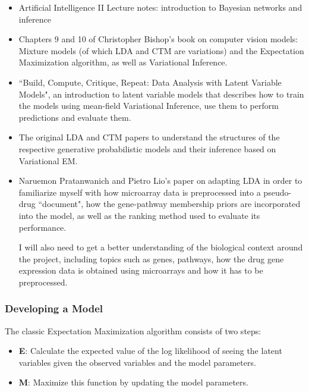 \documentclass[12pt,a4]{article}
\begin{document}
\begin{itemize}
\item Artificial Intelligence II Lecture notes: introduction to Bayesian networks and inference
\item Chapters 9 and 10 of Christopher Bishop's book\cite{Bishop:2006:PRM:1162264} on computer vision models: Mixture models (of which LDA and CTM are variations) and the Expectation Maximization algorithm, as well as Variational Inference.
\item ``Build, Compute, Critique, Repeat: Data Analysis with Latent Variable Models"\cite{doi:10.1146/annurev-statistics-022513-115657}, an introduction to latent variable models that describes how to train the models using mean-field Variational Inference, use them to perform predictions and evaluate them.
\item The original LDA\cite{Blei} and CTM\cite{2007} papers to understand the structures of the respective generative probabilistic models and their inference based on Variational EM.
\item Naruemon Pratanwanich and Pietro Lio's paper\cite{Pratanwanich2014}  on adapting LDA in order to familiarize myself with how microarray data is preprocessed into a pseudo-drug ``document", how the gene-pathway membership priors are incorporated into the model, as well as the ranking method used to evaluate its performance.

I will also need to get a better understanding of the biological context around the project, including topics such as genes, pathways, how the drug gene expression data is obtained using microarrays and how it has to be preprocessed.

\end{itemize}

\subsubsection*{Developing a Model}

The classic Expectation Maximization algorithm consists of two steps:

\begin{itemize}
\item \textbf{E}: Calculate the expected value of the log likelihood of seeing the latent variables given the observed variables and the model parameters.
\item \textbf{M}: Maximize this function by updating the model parameters.
\end{itemize}
\end{document}
